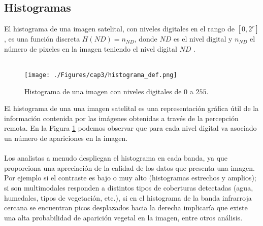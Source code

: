 \subsection{Histogramas}
El histograma de una imagen satelital, con niveles digitales en el rango de $ [0,2^{r}] $, es una funci\'on discreta $ H(ND)=n_{ND} $, donde $ ND $ es el nivel digital y $ n_{ND} $ el n\'umero de pixeles en la imagen teniendo el nivel digital $ ND $ \cite{gonzalez2002woods}.\\~\\
 	\begin{figure}[H]
 		\centering
 		\texttt{[image: ./Figures/cap3/histograma\_def.png]}
 		\caption{Histograma de una imagen con niveles digitales de $ 0 $ a $ 255 $.}
 		\label{fig:histDef}
 	\end{figure}
El histograma de una una imagen satelital es una representaci\'on gr\'afica \'util de la informaci\'on contenida por las im\'agenes obtenidas a trav\'es de la percepci\'on remota. En la Figura \ref{fig:histDef} podemos observar que para cada nivel digital va asociado un n\'umero de apariciones en la imagen.\\~\\
 Los analistas a menudo despliegan el histograma en cada banda, ya que proporciona una apreciaci\'on de la calidad de los datos que presenta una imagen. Por ejemplo si el contraste es bajo o muy alto (histogramas estrechos y amplios); si son multimodales responden a distintos tipos de coberturas detectadas (agua, humedales, tipos de vegetaci\'on, etc.), si en  el histograma de la banda infrarroja cercana se encuentran picos desplazados hacia la derecha implicar\'ia que existe una alta probabilidad de aparici\'on vegetal en la imagen, entre otros an\'alisis.

